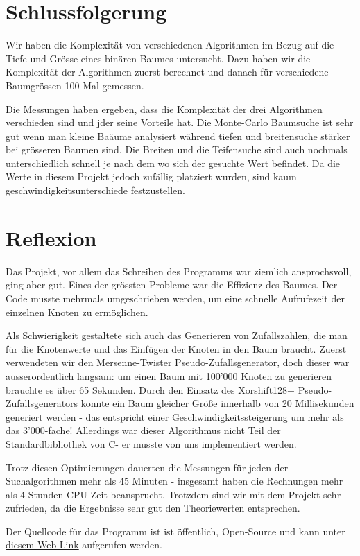 \documentclass[a4paper,11pt]{article}
\newcommand{\CC}{C\nolinebreak\hspace{-.05em}\raisebox{.4ex}{\tiny\bf +}\nolinebreak\hspace{-.10em}\raisebox{.4ex}{\tiny\bf +}\hspace{.1em}}
\begin{document}
\section{Schlussfolgerung}
Wir haben die Komplexität von verschiedenen Algorithmen im Bezug auf die Tiefe und Grösse eines binären Baumes untersucht. Dazu haben wir die Komplexität der Algorithmen zuerst berechnet und danach für verschiedene Baumgrössen 100 Mal gemessen.

Die Messungen haben ergeben, dass die Komplexität der drei Algorithmen verschieden sind und jder seine Vorteile hat. Die Monte-Carlo Baumsuche ist sehr gut wenn man kleine Baäume analysiert während tiefen und breitensuche stärker bei grösseren Baumen sind. Die Breiten und die Teifensuche sind auch nochmals unterschiedlich schnell je nach dem wo sich der gesuchte Wert befindet. Da die Werte in diesem Projekt jedoch zufällig platziert wurden, sind kaum geschwindigkeitsunterschiede festzustellen. 

\section{Reflexion}
Das Projekt, vor allem das Schreiben des Programms war ziemlich ansprochsvoll, ging aber gut. Eines der grössten Probleme war die Effizienz des Baumes. Der Code musste mehrmals umgeschrieben werden, um eine schnelle Aufrufezeit der einzelnen Knoten zu ermöglichen.

Als Schwierigkeit gestaltete sich auch das Generieren von Zufallszahlen, die man für die Knotenwerte und das Einfügen der Knoten in den Baum braucht. Zuerst verwendeten wir den Mersenne-Twister Pseudo-Zufallsgenerator, doch dieser war ausserordentlich langsam: um einen Baum mit 100'000 Knoten zu generieren brauchte es über 65 Sekunden. Durch den Einsatz des Xorshift128+ Pseudo-Zufallsgenerators konnte ein Baum gleicher Größe innerhalb von 20 Millisekunden generiert werden - das entspricht einer Geschwindigkeitssteigerung um mehr als das 3'000-fache! Allerdings war dieser Algorithmus nicht Teil der Standardbibliothek von \CC - er musste von uns implementiert werden.

Trotz diesen Optimierungen dauerten die Messungen für jeden der Suchalgorithmen mehr als 45 Minuten - insgesamt haben die Rechnungen mehr als 4 Stunden CPU-Zeit beansprucht. Trotzdem sind wir mit dem Projekt sehr zufrieden, da die Ergebnisse sehr gut den Theoriewerten entsprechen.

Der Quellcode für das Programm ist ist öffentlich, Open-Source und kann unter \href{https://github.com/Kepler-69c/binaryTree}{diesem Web-Link} aufgerufen werden.

\pagebreak


\end{document}
